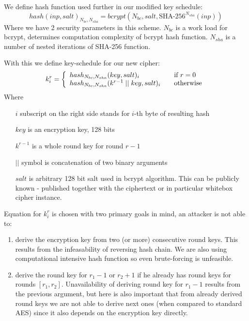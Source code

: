 \documentclass[11pt,oneside,final]{fithesis2}
\begin{document}
    We define hash function used further in our modified key schedule:
    \begin{equation}
	hash\left(inp, salt\right)_{N_{bc}, N_{sha}} = bcrypt\left(N_{bc}, salt, \text{SHA-}256^{N_{sha}}\left(inp\right)\right)
    \end{equation}
    Where we have 2 security parameters in this scheme.
    $N_{bc}$ is a work load for bcrypt, determines computation complexity of bcrypt hash function. $N_{sha}$ is a number of nested iterations of SHA-256 function. 
    
    With this we define key-schedule for our new cipher:
    \begin{equation}\label{eq:keySchedule}
    k_i^r = \left\{ 
    \begin{array}{l l} 
	hash_{N_{bc}, N_{sha}}(key, salt)_i                   & \quad \text{if $r=0$}\\
	hash_{N_{bc}, N_{sha}}(k^{r-1} \; || \;  key, salt)_i & \quad \text{otherwise}
    \end{array} \right.
    \end{equation}
    Where
    \begin{itemize}
     \item[$i$] subscript on the right side stands for $i$-th byte of resulting hash
     \item[$key$] is an encryption key, 128 bits
     \item[$k^{r-1}$] is a whole round key for round $r-1$
     \item[$||$] symbol is concatenation of two binary arguments
     \item[$salt$] is arbitrary 128 bit salt used in bcrypt algorithm. This can be publicly known - published together with the ciphertext or 
	in particular whitebox cipher instance.
    \end{itemize}

    Equation for $k_i^r$ is chosen with two primary goals in mind, an attacker is not able to:
    \begin{enumerate}
     \item derive the encryption key from two (or more) consecutive round keys. This results from the infeasability of reversing hash chain. 
	We are also using computational intensive hash function so even brute-forcing is unfeasible.
     \item derive the round key for $r_1-1$ or $r_2+1$ if he already has round keys for rounds $[r_1, r_2]$. Unavailability of deriving 
	round key for $r_1-1$ results from the previous argument, but here is also important that from already derived round keys we are not able to derive 	
	next ones (when compared to standard AES) since it also depends on the encryption key directly.
    \end{enumerate}
    
\end{document}
